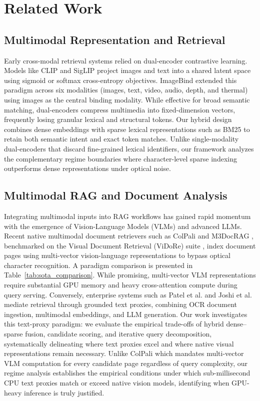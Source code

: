 \documentclass[conference]{IEEEtran}
\begin{document}
\section{Related Work}

\subsection{Multimodal Representation and Retrieval}
Early cross-modal retrieval systems relied on dual-encoder contrastive learning. Models like CLIP \cite{radford2021clip} and SigLIP \cite{zhai2023siglip} project images and text into a shared latent space using sigmoid or softmax cross-entropy objectives. ImageBind \cite{girdhar2023imagebind} extended this paradigm across six modalities (images, text, video, audio, depth, and thermal) using images as the central binding modality. While effective for broad semantic matching, dual-encoders compress multimedia into fixed-dimension vectors, frequently losing granular lexical and structural tokens. Our hybrid design combines dense embeddings with sparse lexical representations such as BM25 \cite{robertson2009bm25} to retain both semantic intent and exact token matches. Unlike single-modality dual-encoders that discard fine-grained lexical identifiers, our framework analyzes the complementary regime boundaries where character-level sparse indexing outperforms dense representations under optical noise.

\subsection{Multimodal RAG and Document Analysis}
Integrating multimodal inputs into RAG workflows has gained rapid momentum with the emergence of Vision-Language Models (VLMs) and advanced LLMs. Recent native multimodal document retrievers such as ColPali \cite{faysse2024colpali} and M3DocRAG \cite{cho2024m3docrag}, benchmarked on the Visual Document Retrieval (ViDoRe) suite \cite{faysse2024colpali}, index document pages using multi-vector vision-language representations to bypass optical character recognition. A paradigm comparison is presented in Table~\ref{tab:sota_comparison}. While promising, multi-vector VLM representations require substantial GPU memory and heavy cross-attention compute during query serving. Conversely, enterprise systems such as Patel et al. \cite{patel2025multimodal} and Joshi et al. \cite{joshi2024multimodel} mediate retrieval through grounded text proxies, combining OCR document ingestion, multimodal embeddings, and LLM generation. Our work investigates this text-proxy paradigm: we evaluate the empirical trade-offs of hybrid dense--sparse fusion, candidate scoring, and iterative query decomposition, systematically delineating where text proxies excel and where native visual representations remain necessary. Unlike ColPali \cite{faysse2024colpali} which mandates multi-vector VLM computation for every candidate page regardless of query complexity, our regime analysis establishes the empirical conditions under which sub-millisecond CPU text proxies match or exceed native vision models, identifying when GPU-heavy inference is truly justified.
\end{document}
